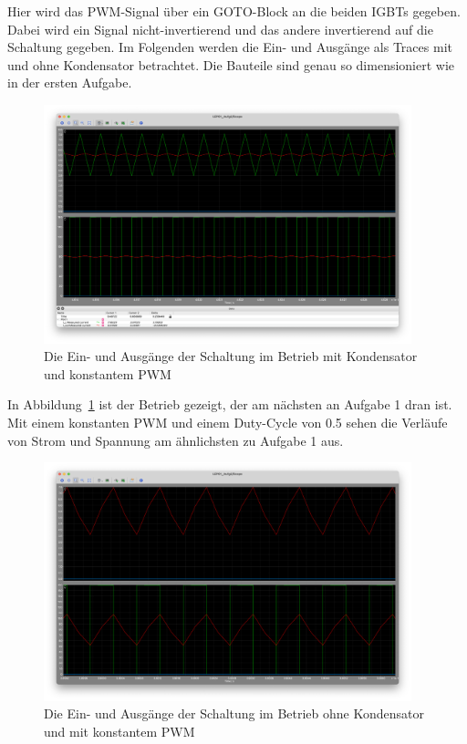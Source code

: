 \documentclass{report}
\begin{document}
Hier wird das PWM-Signal über ein GOTO-Block an die beiden IGBTs gegeben. Dabei wird ein Signal nicht-invertierend und das andere invertierend auf die Schaltung gegeben. Im Folgenden werden die Ein- und Ausgänge als Traces mit und ohne Kondensator betrachtet. Die Bauteile sind genau so dimensioniert wie in der ersten Aufgabe.

\begin{figure}[h]
  \begin{center}
    \includegraphics[width=0.95\textwidth]{assets/img/aufg2_eingang_ausgang_c_wc.png}
  \end{center}
  \caption{Die Ein- und Ausgänge der Schaltung im Betrieb mit Kondensator und konstantem PWM}
  \label{fig:aufg2_eingang_ausgang_c_wc}
\end{figure}

In Abbildung~\ref{fig:aufg2_eingang_ausgang_c_wc} ist der Betrieb gezeigt, der am nächsten an Aufgabe 1 dran ist. Mit einem konstanten PWM und einem Duty-Cycle von 0.5 sehen die Verläufe von Strom und Spannung am ähnlichsten zu Aufgabe 1 aus. 

\begin{figure}[h]
  \begin{center}
    \includegraphics[width=0.95\textwidth]{assets/img/aufg2_eingang_ausgang_c_nc.png}
  \end{center}
  \caption{Die Ein- und Ausgänge der Schaltung im Betrieb ohne Kondensator und mit konstantem PWM}
  \label{fig:aufg2_eingang_ausgang_c_nc}
\end{figure}
\end{document}
